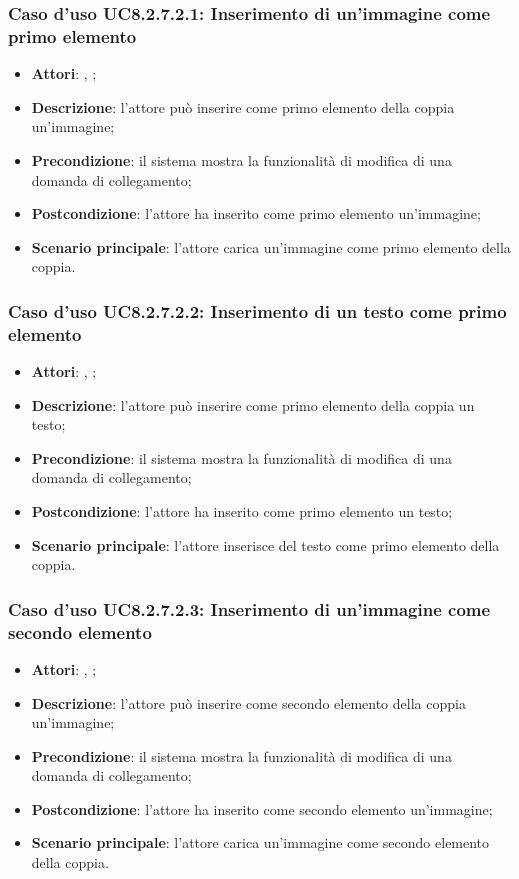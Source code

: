 		\subsubsection{Caso d'uso UC8.2.7.2.1: Inserimento di un'immagine come primo elemento}
		\label{UC8.2.7.2.1}
		\begin{itemize}
			\item \textbf{Attori}: \uau, \uaupro;
			\item \textbf{Descrizione}: l'attore può inserire come primo elemento della coppia un'immagine;
			\item \textbf{Precondizione}: il sistema mostra la funzionalità di modifica di una domanda di collegamento; 
			\item \textbf{Postcondizione}: l'attore ha inserito come primo elemento un'immagine;
			\item \textbf{Scenario principale}: l'attore carica un'immagine come primo elemento della coppia.
		\end{itemize}
		
		\subsubsection{Caso d'uso UC8.2.7.2.2: Inserimento di un testo come primo elemento}
		\label{UC8.2.7.2.2}
		\begin{itemize}
			\item \textbf{Attori}: \uau, \uaupro;
			\item \textbf{Descrizione}: l'attore può inserire come primo elemento della coppia un testo;
			\item \textbf{Precondizione}: il sistema mostra la funzionalità di modifica di una domanda di collegamento; 
			\item \textbf{Postcondizione}: l'attore ha inserito come primo elemento un testo;
			\item \textbf{Scenario principale}: l'attore inserisce del testo come primo elemento della coppia.
		\end{itemize}
		
			\subsubsection{Caso d'uso UC8.2.7.2.3: Inserimento di un'immagine come secondo elemento}
		\label{UC8.2.7.2.3}
		\begin{itemize}
			\item \textbf{Attori}: \uau, \uaupro;
			\item \textbf{Descrizione}: l'attore può inserire come secondo elemento della coppia un'immagine;
			\item \textbf{Precondizione}: il sistema mostra la funzionalità di modifica di una domanda di collegamento; 
			\item \textbf{Postcondizione}: l'attore ha inserito come secondo elemento un'immagine;
			\item \textbf{Scenario principale}: l'attore carica un'immagine come secondo elemento della coppia.
		\end{itemize}
		
